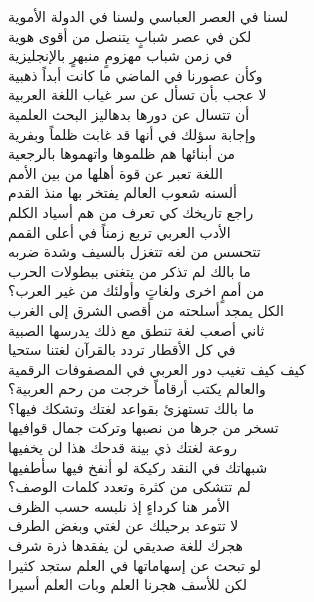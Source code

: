 \documentclass[a4paper,12pt]{article}
\begin{document}
\begin{tcolorbox}[colback=boxcolor,colframe=headercolor,title=\textbf{Stanza 3},breakable]
\textarabic{
لسنا في العصر العباسي ولسنا في الدولة الأموية \\
لكن في عصر شبابٍ يتنصل من أقوى هوية \\
في زمن شباب مهزومٍ منبهرٍ بالإنجليزية \\
وكأن عصورنا في الماضي ما كانت أبداً ذهبية \\
لا عجب بأن تسأل عن سر غياب اللغة العربية \\
أن تتسال عن دورها بدهاليز البحث العلمية \\
وإجابة سؤلك في أنها قد غابت ظلماً وبفرية \\
من أبنائها هم ظلموها واتهموها بالرجعية \\
اللغة تعبر عن قوة أهلها من بين الأمم \\
ألسنه شعوب العالم يفتخر بها منذ القدم \\
راجع تاريخك كي تعرف من هم أسياد الكلم \\
الأدب العربي تربع زمناً في أعلى القمم \\
تتحسس من لغه تتغزل بالسيف وشدة ضربه \\
ما بالك لم تذكر من يتغنى ببطولات الحرب \\
من أممٍ اخرى ولغاتٍ وأولئك من غير العرب؟ \\
الكل يمجد أسلحته من أقصى الشرق إلى الغرب \\
ثاني أصعب لغة تنطق مع ذلك يدرسها الصبية \\
في كل الأقطار تردد بالقرآن لغتنا ستحيا \\
كيف كيف تغيب دور العربي في المصفوفات الرقمية \\
والعالم يكتب أرقاماً خرجت من رحم العربية؟ \\
ما بالك تستهزئ بقواعد لغتك وتشكك فيها؟ \\
تسخر من جرها من نصبها وتركت جمال قوافيها \\
روعة لغتك ذي بينة قدحك هذا لن يخفيها \\
شبهاتك في النقد ركيكة لو أنفخ فيها سأطفيها \\
لم تتشكى من كثرة وتعدد كلمات الوصف؟ \\
الأمر هنا كرداءٍ إذ نلبسه حسب الظرف \\
لا تتوعد برحيلك عن لغتي وبغض الطرف \\
هجرك للغة صديقي لن يفقدها ذرة شرف \\
لو تبحث عن إسهاماتها في العلم ستجد كثيرا \\
لكن للأسف هجرنا العلم وبات العلم أسيرا \\
}
\end{tcolorbox}
\end{document}
